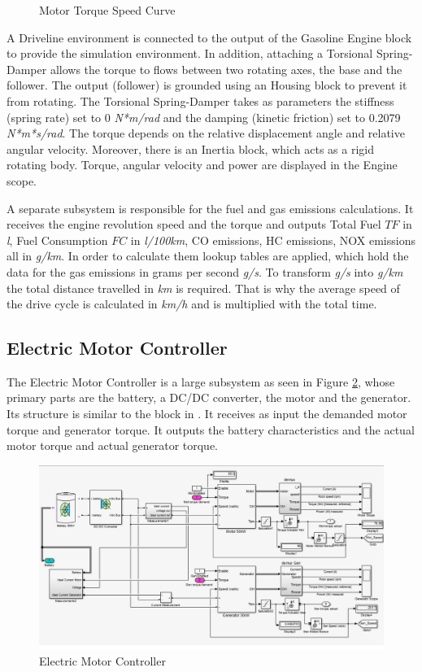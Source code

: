 \begin{figure}[h]
\begin{minipage}{.52\textwidth}
	\caption{Motor Torque Speed Curve}
	\label{fig:motorTorqueSpeed}
\end{minipage}
\end{figure}

A Driveline environment is connected to the output of the Gasoline Engine block to provide the simulation environment. In addition, attaching a Torsional Spring-Damper \citep{tsdMatlab} allows the torque to flows between two rotating axes, the base and the follower. The output (follower) is grounded using an Housing block to prevent it from rotating. The Torsional Spring-Damper takes as parameters the stiffness (spring rate) set to 0 \textit{N*m/rad} and the damping (kinetic friction) set to 0.2079 \textit{N*m*s/rad}. The torque depends on the relative displacement angle and relative angular velocity. Moreover, there is an Inertia block, which acts as a rigid rotating body. Torque, angular velocity and power are displayed in the Engine scope.

A separate subsystem is responsible for the fuel and gas emissions calculations. It receives the engine revolution speed and the torque and outputs Total Fuel $TF$ in \textit{l}, Fuel Consumption $FC$ in \textit{l/100km}, CO emissions, HC emissions, NOX emissions all in \textit{g/km}. In order to calculate them lookup tables are applied, which hold the data for the gas emissions in grams per second \textit{g/s}. To transform \textit{g/s} into \textit{g/km} the total distance travelled in \textit{km} is required. That is why the average speed of the drive cycle is calculated in \textit{km/h} and is multiplied with the total time. 

\subsection{Electric Motor Controller}
The Electric Motor Controller is a large subsystem as seen in Figure \ref{fig:motorController}, whose primary parts are the battery, a DC/DC converter, the motor and the generator. Its structure is similar to the block in \citep{hevMatlab}. It receives as input the demanded motor torque and generator torque. It outputs the battery characteristics and the actual motor torque and actual generator torque.

\begin{figure}[h]
\centering
\includegraphics[scale=0.48]{figures/hev/electricmotorcontroller}
\caption{Electric Motor Controller}
\label{fig:motorController}
\end{figure}

